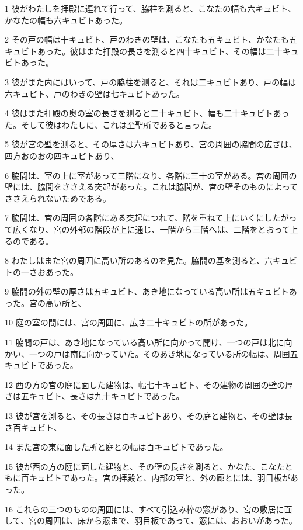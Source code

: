 \par 1 彼がわたしを拝殿に連れて行って、脇柱を測ると、こなたの幅も六キュビト、かなたの幅も六キュビトあった。
\par 2 その戸の幅は十キュビト、戸のわきの壁は、こなたも五キュビト、かなたも五キュビトあった。彼はまた拝殿の長さを測ると四十キュビト、その幅は二十キュビトあった。
\par 3 彼がまた内にはいって、戸の脇柱を測ると、それは二キュビトあり、戸の幅は六キュビト、戸のわきの壁は七キュビトあった。
\par 4 彼はまた拝殿の奥の室の長さを測ると二十キュビト、幅も二十キュビトあった。そして彼はわたしに、これは至聖所であると言った。
\par 5 彼が宮の壁を測ると、その厚さは六キュビトあり、宮の周囲の脇間の広さは、四方おのおの四キュビトあり、
\par 6 脇間は、室の上に室があって三階になり、各階に三十の室がある。宮の周囲の壁には、脇間をささえる突起があった。これは脇間が、宮の壁そのものによってささえられないためである。
\par 7 脇間は、宮の周囲の各階にある突起につれて、階を重ねて上にいくにしたがって広くなり、宮の外部の階段が上に通じ、一階から三階へは、二階をとおって上るのである。
\par 8 わたしはまた宮の周囲に高い所のあるのを見た。脇間の基を測ると、六キュビトの一さおあった。
\par 9 脇間の外の壁の厚さは五キュビト、あき地になっている高い所は五キュビトあった。宮の高い所と、
\par 10 庭の室の間には、宮の周囲に、広さ二十キュビトの所があった。
\par 11 脇間の戸は、あき地になっている高い所に向かって開け、一つの戸は北に向かい、一つの戸は南に向かっていた。そのあき地になっている所の幅は、周囲五キュビトであった。
\par 12 西の方の宮の庭に面した建物は、幅七十キュビト、その建物の周囲の壁の厚さは五キュビト、長さは九十キュビトであった。
\par 13 彼が宮を測ると、その長さは百キュビトあり、その庭と建物と、その壁は長さ百キュビト、
\par 14 また宮の東に面した所と庭との幅は百キュビトであった。
\par 15 彼が西の方の庭に面した建物と、その壁の長さを測ると、かなた、こなたともに百キュビトであった。宮の拝殿と、内部の室と、外の廊とには、羽目板があった。
\par 16 これらの三つのものの周囲には、すべて引込み枠の窓があり、宮の敷居に面して、宮の周囲は、床から窓まで、羽目板であって、窓には、おおいがあった。
